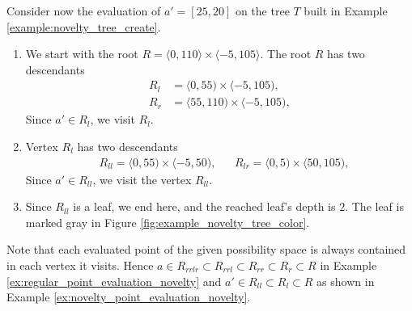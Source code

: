 \begin{example}
\label{ex:novelty_point_evaluation_novelty}
    Consider now the evaluation of $a' = [25,20]$ on the tree $T$ built in Example \ref{example:novelty_tree_create}.

\begin{enumerate}
    \item  We start with the root $R = \langle 0,110\rangle \times \langle -5, 105 \rangle$.
    The root $R$ has two descendants 
\begin{align*}
    R_l &= \langle 0,55) \times \langle -5, 105),\\
    R_r &= \langle 55,110) \times \langle -5, 105),
\end{align*}
Since $a' \in R_l$, we visit $R_l$.
\item Vertex $R_l$ has two descendants
\begin{align*}
    &R_{ll} = \langle 0,55) \times \langle -5, 50),&
    &R_{lr} = \langle 0,5) \times \langle 50, 105),
\end{align*}
Since $a' \in R_{ll}$, we visit the vertex $R_{ll}$.
\item
Since $R_{ll}$ is a leaf, we end here, and the reached leaf's depth is $2$. The leaf is marked gray in Figure \ref{fig:example_novelty_tree_color}.
\end{enumerate}
\end{example}
Note that each evaluated point of the given possibility space is always contained in each vertex it visits.
Hence $a \in R_{rrlr} \subset R_{rrl} \subset R_{rr} \subset R_{r} \subset R$ in Example \ref{ex:regular_point_evaluation_novelty}
and $a' \in R_{ll} \subset R_{l} \subset R$ as shown in Example \ref{ex:novelty_point_evaluation_novelty}.



\begin{figure*}[!t]
\centering

\caption{Tree constructed using the enhanced novelty approach.}
\label{fig:example_novelty_tree_color}
\end{figure*}


% 


